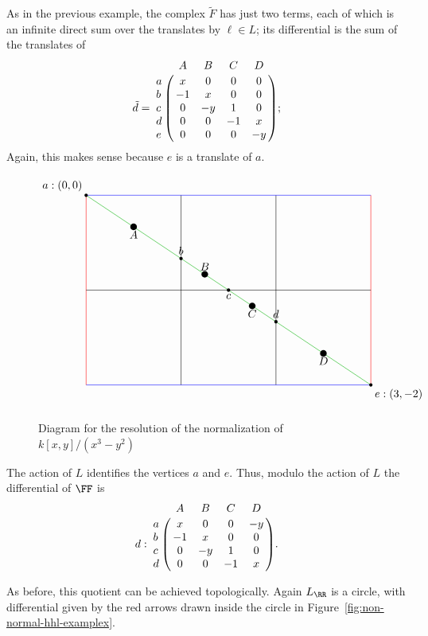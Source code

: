 \documentclass{amsart}
\begin{document}
\begin{example} 
As in the previous example, the complex $\tilde F$
has just two terms, each of which is an infinite direct sum over the translates by $\ell \in L$; its differential is the sum of the translates of
$$
\tilde d = \bordermatrix{
     &A&B&C&D\cr
    a&x&0&0&0\cr
    b&-1&x&0&0\cr
    c&0&-y&1&0\cr
    d&0&0&-1&x\cr
    e&0&0&0&-y
};
$$
\noindent Again, this makes sense because $e$ is a translate of $a$.

\begin{figure}[h]
\caption{Diagram for the resolution of the normalization of $k[x,y]/(x^3-y^2)$}
\label{fig:cuspidal cubic 1}
$$
\begin{tikzpicture}[scale=3]
  \draw (1, 0) -- (1, -2);
  \draw (2, 0) -- (2, -2);

  \draw[blue] (0,  0) -- (3,  0);
  \draw[blue] (0, -2) -- (3, -2);

  \draw[red] (0,  0) -- (0, -2);
  \draw[red] (3,  0) -- (3, -2);
  \draw (0, -1) -- (3, -1);

  \draw[green!70!black] (0,0) -- (3,-2);

  \fill (0,0)    circle (.5pt) node[above left]  {$a:(0,0)$};
  \fill (1,-2/3) circle (.5pt) node[above]        {$b$};
  \fill (3/2,-1) circle (.5pt) node[below]        {$c$};
  \fill (2,-4/3) circle (.5pt) node[above]        {$d$};
  \fill (3,-2)   circle (.5pt) node[below right]  {$e:(3,-2)$};

  \fill (1/2,-1/3)   circle (1pt) node[below]  {$A$};
  \fill (5/4,-5/6)   circle (1pt) node[above]  {$B$};
  \fill (7/4,-7/6)   circle (1pt) node[below]  {$C$};
  \fill (5/2,-5/3)   circle (1pt) node[below]  {$D$};
\end{tikzpicture}
$$
\end{figure}

The action of $L$ identifies the vertices $a$ and $e$. Thus, modulo the action of $L$ the  differential
of $\FF$ is
$$d: 
\bordermatrix{
     &A&B&C&D\cr
    a&x&0&0&-y\cr
    b&-1&x&0&0\cr
    c&0&-y&1&0\cr
    d&0&0&-1&x\cr    
}.
$$

As before, this quotient can be achieved topologically. Again $L_{\RR}$ is a circle, with differential
given by the red arrows drawn inside the circle in
Figure~\ref{fig:non-normal-hhl-examplex}. 
 

\end{example}
\end{document}
